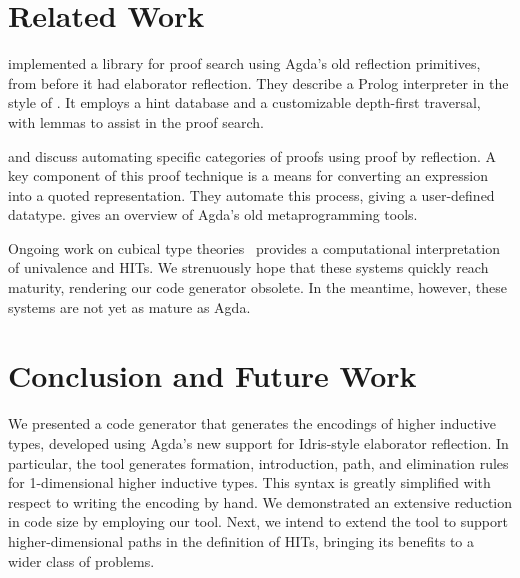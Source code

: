 \documentclass[sigplan,10pt]{acmart}
\begin{document}

\section{Related Work}

\citet{Kokke-2015} implemented a library for proof search using Agda's old reflection primitives, from before it had elaborator reflection. They describe a Prolog interpreter in the style of \citet{Stutterheim-2013}. It employs a hint database and a customizable depth-first traversal, with lemmas to assist in the proof search.

\citet{Walt-2013} and \citet{Walt-2012} discuss automating specific categories of proofs using proof by reflection.
A key component of this proof technique is a means for converting an expression into a quoted representation.
They automate this process, giving a user-defined datatype. \citeauthor{Walt-2012} gives an overview of Agda's old metaprogramming tools.

Ongoing work on cubical type theories~\citep{cohen, Angiuli-2017, cubicalHIT} provides a computational interpretation of univalence and HITs.
We strenuously hope that these systems quickly reach maturity, rendering our code generator obsolete.
In the meantime, however, these systems are not yet as mature as Agda.

\section{Conclusion and Future Work}

We presented a code generator that generates the encodings of higher inductive types, developed using Agda's new support for Idris-style elaborator reflection.
In particular, the tool generates formation, introduction, path, and elimination rules for 1-dimensional higher inductive types.
This syntax is greatly simplified with respect to writing the encoding by hand.
We demonstrated an extensive reduction in code size by employing our tool. Next, we intend to extend the tool to support higher-dimensional paths in the definition of HITs, bringing its benefits to a wider class of problems.




\end{document}
